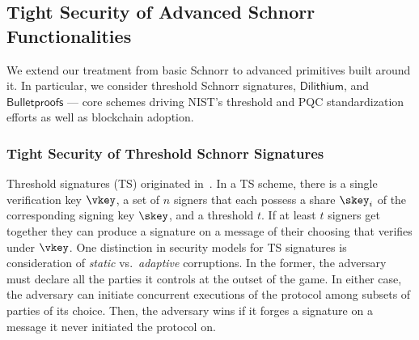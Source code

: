 \subsection{Tight Security of     Advanced Schnorr Functionalities}

We extend our treatment from basic Schnorr to advanced primitives built around it. In particular, we consider threshold Schnorr signatures, $\mathsf{Dilithium}$, and $\mathsf{Bulletproofs}$ --- core schemes driving NIST’s threshold and PQC standardization efforts as well as blockchain adoption.



 \subsubsection{Tight Security of Threshold Schnorr Signatures}
 

\iffalse
Threshold signatures (TS) originated in~\cite{C:Desmedt87,C:DesFra89}. In a TS scheme, there is a single verification key $\vkey$, a set of $n$ signers that each possess a share $\skey_i$ of the corresponding signing key $\skey$, and a threshold $t$. If at least $t$ signers get together they can produce a signature on a message of their choosing that verifies under $\vkey$. One distinction in security models for TS signatures is consideration of \emph{static} vs.~\emph{adaptive} corruptions.  In the former, the adversary must declare all the parties it controls at the outset of the game. In either case, the adversary can initiate concurrent executions of the protocol among subsets of parties of its choice.  Then, the adversary wins if it forges a signature on a message it never initiated the protocol on. %


